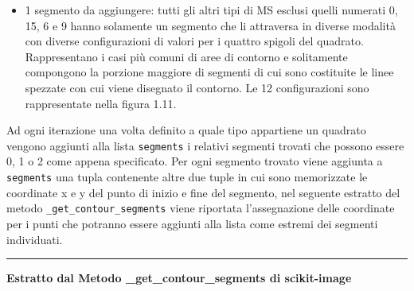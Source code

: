 \documentclass[12pt,a4paper]{report}
\begin{document}
\begin{itemize}
\item 1 segmento da aggiungere: tutti gli altri tipi di MS esclusi quelli numerati 0, 15, 6 e 9 hanno solamente un segmento che li attraversa in diverse modalità con diverse configurazioni di valori per i quattro spigoli del quadrato.  Rappresentano i casi più comuni di aree di contorno e   solitamente compongono la porzione maggiore di segmenti di cui sono costituite le linee spezzate con cui viene disegnato il contorno. Le 12 configurazioni sono rappresentate nella figura 1.11.
\begin{figure}[H]
\centering
\begin{floatrow}[1]
\end{floatrow}
\end{figure}

\end{itemize}
Ad ogni iterazione una volta definito a quale tipo appartiene un quadrato vengono aggiunti alla lista \verb|segments| i relativi segmenti trovati che possono essere 0, 1 o 2 come appena specificato.  Per ogni segmento trovato viene aggiunta a  \verb|segments| una tupla contenente altre due tuple in cui sono memorizzate le coordinate x e y del punto di inizio e fine del segmento, nel seguente estratto del metodo  \verb|_get_contour_segments| viene riportata l'assegnazione delle coordinate per i punti che potranno essere aggiunti alla lista come estremi dei segmenti individuati.\newpage
\noindent\rule[0.5ex]{\linewidth}{2pt}
\small{\textbf{Estratto dal Metodo \_get\_contour\_segments di scikit-image}} \\
\end{document}
